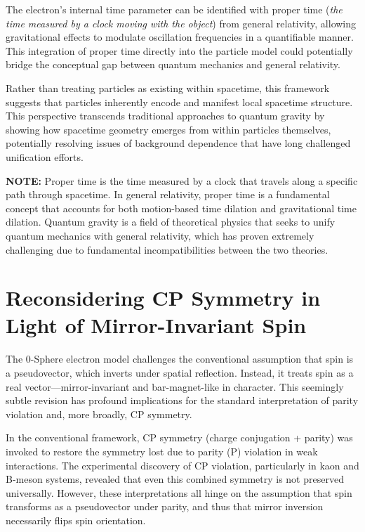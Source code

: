 \documentclass[12pt,letterpaper]{article} %
\begin{document}
The electron's internal time parameter can be identified with proper time (\textit{the time measured by a clock moving with the object}) from general relativity, allowing gravitational effects to modulate oscillation frequencies in a quantifiable manner\cite{einstein1912}. This integration of proper time directly into the particle model could potentially bridge the conceptual gap between quantum mechanics and general relativity.

Rather than treating particles as existing within spacetime, this framework suggests that particles inherently encode and manifest local spacetime structure\cite{penrose1971}. This perspective transcends traditional approaches to quantum gravity by showing how spacetime geometry emerges from within particles themselves, potentially resolving issues of background dependence that have long challenged unification efforts.

\vspace{0.5cm}
\noindent\textbf{NOTE:} Proper time is the time measured by a clock that travels along a specific path through spacetime. In general relativity, proper time is a fundamental concept that accounts for both motion-based time dilation and gravitational time dilation. Quantum gravity is a field of theoretical physics that seeks to unify quantum mechanics with general relativity, which has proven extremely challenging due to fundamental incompatibilities between the two theories.


\section{Reconsidering CP Symmetry in Light of Mirror-Invariant Spin}

The 0-Sphere electron model challenges the conventional assumption that spin is a pseudovector, which inverts under spatial reflection. Instead, it treats spin as a real vector—mirror-invariant and bar-magnet-like in character. This seemingly subtle revision has profound implications for the standard interpretation of parity violation and, more broadly, CP symmetry.

In the conventional framework, CP symmetry (charge conjugation + parity) was invoked to restore the symmetry lost due to parity (P) violation in weak interactions. The experimental discovery of CP violation, particularly in kaon and B-meson systems, revealed that even this combined symmetry is not preserved universally. However, these interpretations all hinge on the assumption that spin transforms as a pseudovector under parity, and thus that mirror inversion necessarily flips spin orientation.
\end{document}
